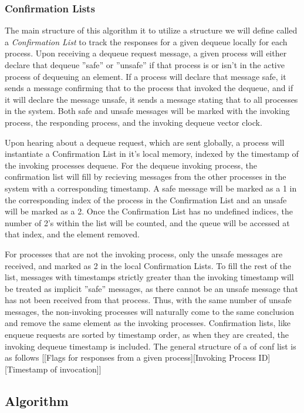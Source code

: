 \documentclass[a4paper,USenglish]{lipics-v2021} %
\begin{document}
\subsubsection{Confirmation Lists}
The main structure of this algorithm it to utilize a structure we will define called a \emph{Confirmation List} to track the responses for a given dequeue locally for each process. Upon receiving a dequeue request message, a given process will either declare that dequeue ”safe” or ”unsafe” if that process is or isn’t in the active process of dequeuing an element. If a process will declare that message safe, it sends a message confirming that to the process that invoked the dequeue, and if it will declare the message unsafe, it sends a message stating that to all processes in the system. Both safe and unsafe messages will be marked with the invoking process, the responding process, and the invoking dequeue vector clock.

Upon hearing about a dequeue request, which are sent globally, a process will instantiate a Confirmation List in it’s local memory, indexed by the timestamp of the invoking processes dequeue. For the dequeue invoking process, the confirmation list will fill by recieving messages from the other processes in the system with a corresponding timestamp. A safe message will be marked as a 1 in the corresponding index of the process in the Confirmation List and an unsafe will be marked as a 2. Once the Confirmation List has no undefined indices, the number of 2’s within the list will be counted, and the queue will be accessed at that index, and the element removed.

For processes that are not the invoking process, only the unsafe messages are received, and marked as 2 in the local Confirmation Lists. To fill the rest of the list, messages with timestamps strictly greater than the invoking timestamp will be treated as implicit ”safe” messages, as there cannot be an unsafe message that has not been received from that process. Thus, with the same number of unsafe messages, the non-invoking processes will naturally come to the same conclusion and remove the same element as the invoking processes.  Confirmation lists, like enqueue requests are sorted by timestamp order, as when they are created, the invoking dequeue timestamp is included. The general structure of a of conf list is as follows [[Flags for responses from a given process][Invoking Process ID][Timestamp of invocation]]


\subsection{Algorithm}
\end{document}
